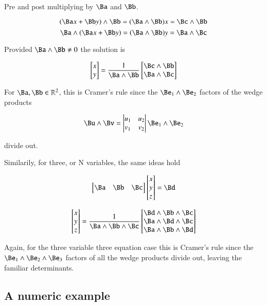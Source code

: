 \documentclass{article}      %
\begin{document}
Pre and post multiplying by $\Ba$ and $\Bb$.

\[
      ( \Ba x + \Bb y ) \wedge \Bb = (\Ba \wedge \Bb) x =       \Bc \wedge \Bb
\]
\[
\Ba \wedge ( \Ba x + \Bb y )       = (\Ba \wedge \Bb) y = \Ba \wedge \Bc      
\]

Provided $\Ba \wedge \Bb \neq 0$ the solution is

\[
\begin{bmatrix}x \\ y\end{bmatrix}
= \frac{1}{\Ba \wedge \Bb}
\begin{bmatrix}
\Bc \wedge \Bb \\ \Ba \wedge \Bc
\end{bmatrix}
\]

For $\Ba, \Bb \in {\mathbb R}^2$, this is Cramer's rule since the $\Be _1 \wedge \Be _2$ factors of the wedge products

\[
\Bu \wedge \Bv = \begin{vmatrix}u_1 & u_2 \\ v_1 & v_2 \end{vmatrix} \Be _1 \wedge \Be _2
\]

divide out.

Similarily, for three, or N variables, the same ideas hold

\[
\begin{bmatrix}
\Ba & \Bb & \Bc
\end{bmatrix}
\begin{bmatrix}
x \\ y \\ z
\end{bmatrix}
= \Bd
\]

\[
\begin{bmatrix}
x \\ y \\ z
\end{bmatrix}
= \frac{1}{\Ba \wedge \Bb \wedge \Bc}
\begin{bmatrix}
\Bd \wedge \Bb \wedge \Bc \\
\Ba \wedge \Bd \wedge \Bc \\
\Ba \wedge \Bb \wedge \Bd
\end{bmatrix}
\]

Again, for the three variable three equation case this is Cramer's rule since the $\Be _1 \wedge \Be _2 \wedge \Be _3$ factors of all the wedge products divide out, leaving the familiar determinants.

\subsection{A numeric example}
\end{document}
